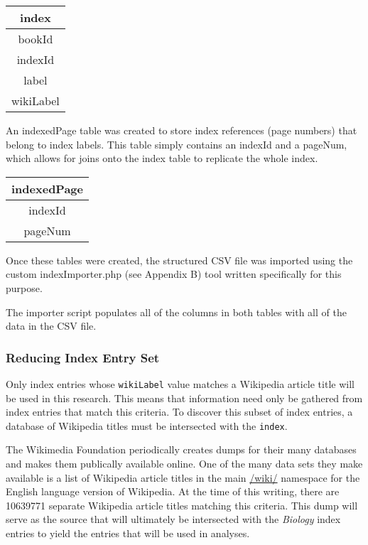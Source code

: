\begin{center}
\begin{tabular}{|c|}
\hline 
\textbf{index} \\ 
\hline 
bookId \\ 
\hline 
indexId \\ 
\hline 
label \\ 
\hline 
wikiLabel \\ 
\hline 
\end{tabular}
\end{center}
 
An indexedPage table was created to store index references (page numbers) that belong to index labels.
This table simply contains an indexId and a pageNum, which allows for joins onto the index table to replicate the whole index.

\begin{center}
\begin{tabular}{|c|}
\hline 
\textbf{indexedPage} \\ 
\hline 
indexId \\ 
\hline 
pageNum \\ 
\hline 
\end{tabular} 
\end{center}

Once these tables were created, the structured CSV file was imported using the custom indexImporter.php (see Appendix B) tool written specifically for this purpose.

The importer script populates all of the columns in both tables with all of the data in the CSV file.

\subsubsection{Reducing Index Entry Set}
\label{subsec:reducing}

Only index entries whose {\tt wikiLabel} value matches a Wikipedia article title will be used in this research.
This means that information need only be gathered from index entries that match this criteria.
To discover this subset of index entries, a database of Wikipedia titles must be intersected with the {\tt index}.

The Wikimedia Foundation periodically creates dumps for their many databases and makes them publically available online\cite{wiki-dumps}.
One of the many data sets they make available is a list of Wikipedia article titles in the main \url{/wiki/} namespace for the English language version of Wikipedia\cite{wiki-dump-titles}.
At the time of this writing, there are 10639771 separate Wikipedia article titles matching this criteria.
This dump will serve as the source that will ultimately be intersected with the {\it Biology} index entries to yield the entries that will be used in analyses.

